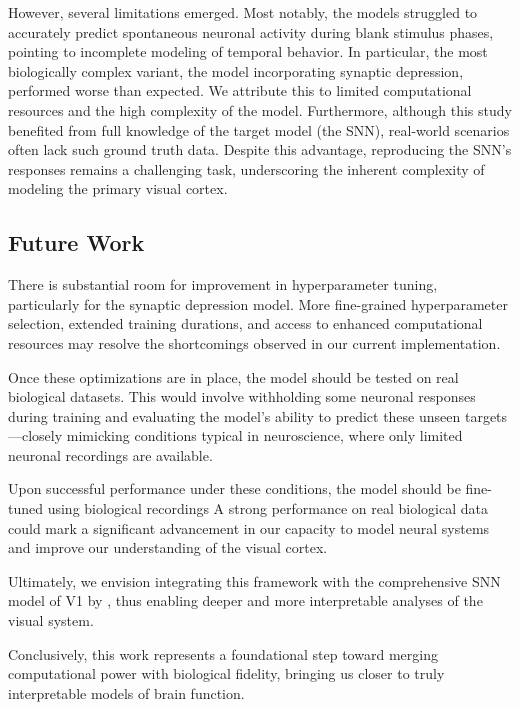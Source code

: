 However, several limitations emerged. Most notably, the models struggled to accurately predict spontaneous neuronal activity during blank stimulus phases, pointing to incomplete modeling of temporal behavior. In particular, the most biologically complex variant, the model incorporating synaptic depression, performed worse than expected. We attribute this to limited computational resources and the high complexity of the model. Furthermore, although this study benefited from full knowledge of the target model (the SNN), real-world scenarios often lack such ground truth data. Despite this advantage, reproducing the SNN's responses remains a challenging task, underscoring the inherent complexity of modeling the primary visual cortex.

\subsection*{Future Work}

There is substantial room for improvement in hyperparameter tuning, particularly for the synaptic depression model. More fine-grained hyperparameter selection, extended training durations, and access to enhanced computational resources may resolve the shortcomings observed in our current implementation.

Once these optimizations are in place, the model should be tested on real biological datasets. This would involve withholding some neuronal responses during training and evaluating the model's ability to predict these unseen targets—closely mimicking conditions typical in neuroscience, where only limited neuronal recordings are available.

Upon successful performance under these conditions, the model should be fine-tuned using biological recordings A strong performance on real biological data could mark a significant advancement in our capacity to model neural systems and improve our understanding of the visual cortex.

Ultimately, we envision integrating this framework with the comprehensive SNN model of V1 by \citet{antolik2024comprehensive}, thus enabling deeper and more interpretable analyses of the visual system.

Conclusively, this work represents a foundational step toward merging computational power with biological fidelity, bringing us closer to truly interpretable models of brain function.
